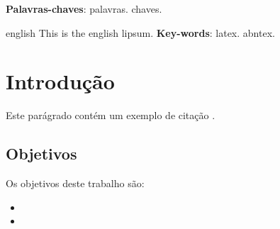 \documentclass{utfpr-pg}
\begin{document}
\frenchspacing

\imprimircapa
\imprimirfolhaderosto

 \begin{resumo}
   \lipsum[23]
   \vspace{\onelineskip}
   \noindent
   \textbf{Palavras-chaves}: palavras. chaves.
 \end{resumo}

 \begin{resumo}[Abstract]
   \begin{otherlanguage*}{english}
     This is the english lipsum. \lipsum[2]
     \vspace{\onelineskip}
     \noindent
     \textbf{Key-words}: latex. abntex.
   \end{otherlanguage*}
 \end{resumo}






\tableofcontents*
\cleardoublepage

\textual
\pagestyle{simple}

\chapter{Introdução}
\lipsum[1] Este parágrado contém um exemplo de citação \cite{kwiatkowska_probabilistic_2002}.

\section{Objetivos}
Os objetivos deste trabalho são:
\begin{itemize}
\item \lipsum[2]
\item \lipsum[3]
\end{itemize}
\end{document}
